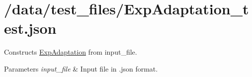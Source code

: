 \hypertarget{_2data_2test_files_2ExpAdaptation_test_8json-example}{}\section{/data/test\+\_\+files/\+Exp\+Adaptation\+\_\+test.\+json}
Constructs \hyperlink{classExpAdaptation}{Exp\+Adaptation} from input\+\_\+file. 
\begin{DoxyParams}{Parameters}
{\em input\+\_\+file} & Input file in .json format.\\
\hline
\end{DoxyParams}

\begin{DoxyCodeInclude}
\end{DoxyCodeInclude}
 